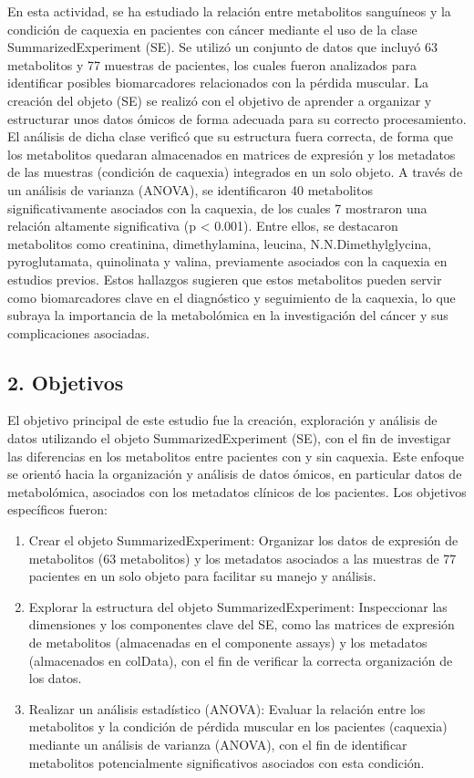 \documentclass[
]{article}
\begin{document}
En esta actividad, se ha estudiado la relación entre metabolitos
sanguíneos y la condición de caquexia en pacientes con cáncer mediante
el uso de la clase SummarizedExperiment (SE). Se utilizó un conjunto de
datos que incluyó 63 metabolitos y 77 muestras de pacientes, los cuales
fueron analizados para identificar posibles biomarcadores relacionados
con la pérdida muscular. La creación del objeto (SE) se realizó con el
objetivo de aprender a organizar y estructurar unos datos ómicos de
forma adecuada para su correcto procesamiento. El análisis de dicha
clase verificó que su estructura fuera correcta, de forma que los
metabolitos quedaran almacenados en matrices de expresión y los
metadatos de las muestras (condición de caquexia) integrados en un solo
objeto. A través de un análisis de varianza (ANOVA), se identificaron 40
metabolitos significativamente asociados con la caquexia, de los cuales
7 mostraron una relación altamente significativa (p \textless{} 0.001).
Entre ellos, se destacaron metabolitos como creatinina, dimethylamina,
leucina, N.N.Dimethylglycina, pyroglutamata, quinolinata y valina,
previamente asociados con la caquexia en estudios previos. Estos
hallazgos sugieren que estos metabolitos pueden servir como
biomarcadores clave en el diagnóstico y seguimiento de la caquexia, lo
que subraya la importancia de la metabolómica en la investigación del
cáncer y sus complicaciones asociadas.

\subsection{2. Objetivos}\label{objetivos}

El objetivo principal de este estudio fue la creación, exploración y
análisis de datos utilizando el objeto SummarizedExperiment (SE), con el
fin de investigar las diferencias en los metabolitos entre pacientes con
y sin caquexia. Este enfoque se orientó hacia la organización y análisis
de datos ómicos, en particular datos de metabolómica, asociados con los
metadatos clínicos de los pacientes. Los objetivos específicos fueron:

\begin{enumerate}
\def\labelenumi{\arabic{enumi}.}
\item
  Crear el objeto SummarizedExperiment: Organizar los datos de expresión
  de metabolitos (63 metabolitos) y los metadatos asociados a las
  muestras de 77 pacientes en un solo objeto para facilitar su manejo y
  análisis.
\item
  Explorar la estructura del objeto SummarizedExperiment: Inspeccionar
  las dimensiones y los componentes clave del SE, como las matrices de
  expresión de metabolitos (almacenadas en el componente assays) y los
  metadatos (almacenados en colData), con el fin de verificar la
  correcta organización de los datos.
\item
  Realizar un análisis estadístico (ANOVA): Evaluar la relación entre
  los metabolitos y la condición de pérdida muscular en los pacientes
  (caquexia) mediante un análisis de varianza (ANOVA), con el fin de
  identificar metabolitos potencialmente significativos asociados con
  esta condición.
\end{enumerate}
\end{document}
